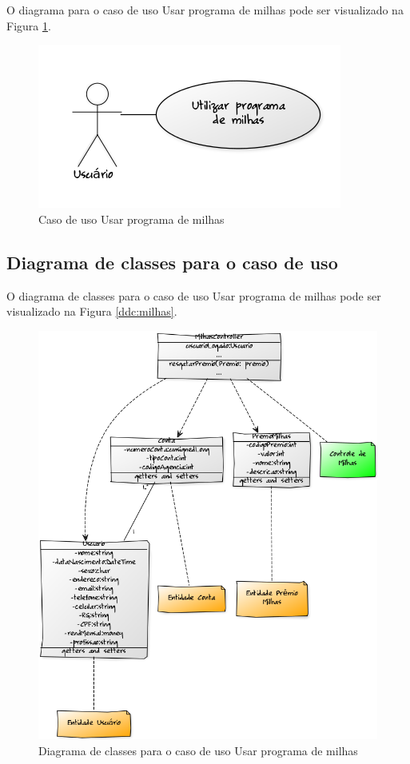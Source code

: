 O diagrama para o caso de uso Usar programa de milhas pode ser visualizado na Figura \ref{cdu:programaMilhas}.

\begin{figure}[!htb]
     \centering
     \includegraphics[scale=0.6]{diagramas/caso-de-uso/imagens/utilizarProgramaMilhas.png}
     \caption{Caso de uso Usar programa de milhas}
     \label{cdu:programaMilhas}
\end{figure}

\subsection{Diagrama de classes para o caso de uso}

O diagrama de classes para o caso de uso Usar programa de milhas pode ser visualizado na Figura \ref{ddc:milhas}.

\begin{figure}[!htb]
     \centering
     \includegraphics[scale=0.5]{diagramas/diagrama-de-classe/imagens/milhas.png}
     \caption{Diagrama de classes para o caso de uso Usar programa de milhas}
     \label{ddc:notificacao}
\end{figure}
